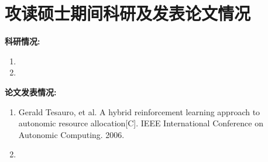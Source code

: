 \chapter{攻读硕士期间科研及发表论文情况}

{
   \noindent \sanhao \bf 科研情况:
}



\begin{enumerate}[label*=项目\arabic*：, leftmargin=*, labelindent=\parindent, itemindent=6em]
	\item 
    \item 
\end{enumerate}


{
    \noindent \sanhao \bf 论文发表情况:
}

\begin{enumerate}[label*=发表\arabic*：, leftmargin=*, labelindent=\parindent, itemindent=6em]
	\item Gerald Tesauro, et al. A hybrid reinforcement learning approach to autonomic resource allocation[C]. IEEE International Conference on Autonomic Computing. 2006.
    \item 
\end{enumerate}